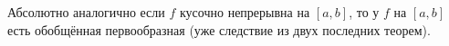 
    	Абсолютно аналогично если $f$ кусочно непрерывна на $[a,b]$, то у $f$ на $[a,b]$ есть обобщённая первообразная (уже следствие из двух последних теорем).
    